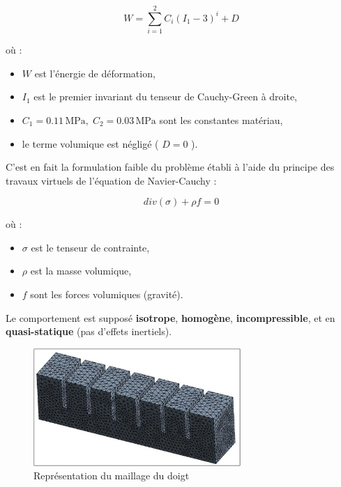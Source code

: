 \documentclass[a4paper, 11pt]{report}
\begin{document}
            \[
            W = \sum_{i=1}^{2} C_i (I_1 - 3)^i + D
            \]

            où :
            \begin{itemize}
            \item \( W \) est l'énergie de déformation,
            \item \( I_1 \) est le premier invariant du tenseur de Cauchy-Green à droite,
            \item \( C_1 = 0.11\,\text{MPa},\; C_2 = 0.03\,\text{MPa} \) sont les constantes matériau,
            \item le terme volumique est négligé ( \( D = 0 \) ).
            \end{itemize}

            C'est en fait la formulation faible du problème établi à l'aide du principe des travaux virtuels de l'équation de Navier-Cauchy :

            \[
            div(\sigma) + \rho f = 0
            \]

            où :
            \begin{itemize}
            \item \( \sigma \) est le tenseur de contrainte,
            \item \( \rho \) est la masse volumique,
            \item \( f \) sont les forces volumiques (gravité).
            \end{itemize}

            Le comportement est supposé \textbf{isotrope}, \textbf{homogène}, \textbf{incompressible}, et en \textbf{quasi-statique} (pas d’effets inertiels).

            \begin{figure}
                \centering
                \includegraphics[width=0.7\textwidth]{Figures/doigt_finit_elements.jpg}
                \caption{Représentation du maillage du doigt \cite{bhat_numerical_2025}}
                \label{fig:doigt_finit_elements}
            \end{figure}
\end{document}
